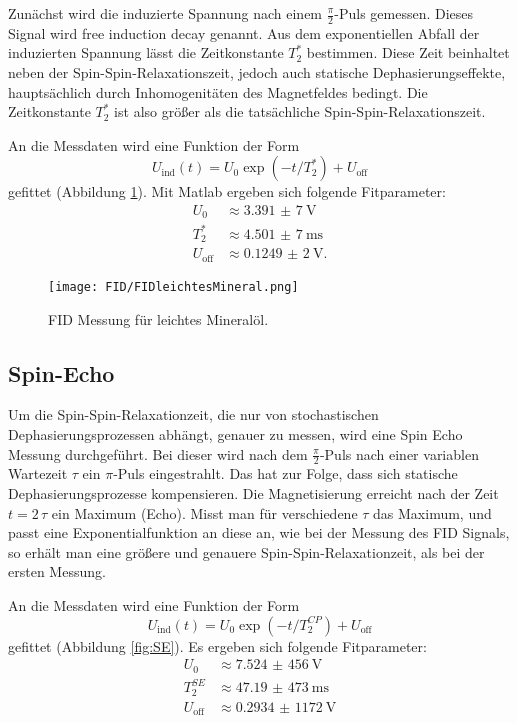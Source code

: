\documentclass[10pt,twoside]{article}
\renewcommand{\1}{^{-1}}
\renewcommand{\2}{^{-2}}
\newcommand{\3}{^{-3}}
\newcommand{\4}{^{-4}}
\newcommand{\5}{^{-5}}
\newcommand{\6}{^{-6}}
\newcommand{\7}{^{-7}}
\newcommand{\8}{^{-8}}
\newcommand{\9}{^{-9}}
\begin{document}
Zunächst wird die induzierte Spannung nach einem $\frac{\pi}{2}$-Puls gemessen. Dieses Signal wird free induction decay genannt. Aus dem exponentiellen Abfall der induzierten Spannung lässt die Zeitkonstante $T_{2}^*$ bestimmen. Diese Zeit beinhaltet neben der Spin-Spin-Relaxationszeit, jedoch auch statische Dephasierungseffekte, hauptsächlich durch Inhomogenitäten des Magnetfeldes bedingt.
Die Zeitkonstante $T_{2}^*$ ist also größer als die tatsächliche Spin-Spin-Relaxationszeit.

An die Messdaten wird eine Funktion der Form
\begin{equation}
U_{\text{ind}}(t)=U_0 \exp(-t/T_{2}^*) + U_{\text{off}}
\end{equation}
gefittet (Abbildung \ref{fig:FID}).
Mit Matlab ergeben sich folgende Fitparameter:
\begin{align*} 
U_0 	&\approx  \SI{3,391(7)}{\volt} \\ 
T_{2}^{\text{*}} &\approx  \SI{4,501(7)}{\milli\second} \\
U_{\text{off}}	&\approx  \SI{0,1249(2)}{\volt}{.}
\end{align*}

\begin{figure}[H]
\centering
\texttt{[image: FID/FIDleichtesMineral.png]} 
\caption{FID Messung für leichtes Mineralöl.}
\label{fig:FID}
\end{figure}
\newpage
\subsection{Spin-Echo}

Um die Spin-Spin-Relaxationzeit, die nur von stochastischen Dephasierungsprozessen abhängt, genauer zu messen, wird eine Spin Echo Messung durchgeführt.
Bei dieser wird nach dem $\frac{\pi}{2}$-Puls nach einer variablen Wartezeit $\tau$ ein $\pi$-Puls eingestrahlt. Das hat zur Folge, dass sich statische Dephasierungsprozesse kompensieren. Die Magnetisierung erreicht nach der Zeit $t=2\,\tau$ ein Maximum (Echo).
Misst man für verschiedene $\tau$ das Maximum, und passt eine Exponentialfunktion an diese an, wie bei der Messung des FID Signals, so erhält man eine größere und genauere Spin-Spin-Relaxationzeit, als bei der ersten Messung.

An die Messdaten wird eine Funktion der Form
\begin{equation}
U_{\text{ind}}(t)= U_0 \exp(-t/T_{2}^{CP}) + U_{\text{off}}
\end{equation}
gefittet (Abbildung \ref{fig:SE}).
Es ergeben sich folgende Fitparameter:
\begin{align*} 
U_0 	&\approx  \SI{7,524(456)}{\volt} \\ 
T_{2}^{SE} &\approx  \SI{47,19(473)}{\milli\second} \\
U_{\text{off}}	&\approx  \SI{0,2934(1172)}{\volt}
\end{align*}
\end{document}
